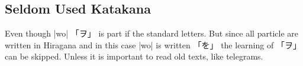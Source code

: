 \subsection{Seldom Used Katakana}\label{subsec:SeldomlyUsedKatakana}


Even though |wo| {「ヲ」}  is part if the standard letters. But since all
particle are written in Hiragana and in this case |wo| is written {「を」} the
learning of {「ヲ」} can be skipped. Unless it is important to read old texts,
like telegrams.


